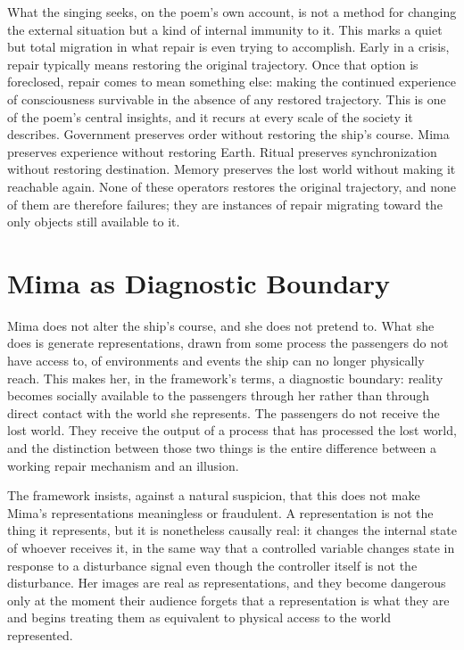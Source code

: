 \documentclass[11pt]{article}
\begin{document}
What the singing seeks, on the poem's own account, is not a method for changing the external situation but a kind of internal immunity to it. This marks a quiet but total migration in what repair is even trying to accomplish. Early in a crisis, repair typically means restoring the original trajectory. Once that option is foreclosed, repair comes to mean something else: making the continued experience of consciousness survivable in the absence of any restored trajectory. This is one of the poem's central insights, and it recurs at every scale of the society it describes. Government preserves order without restoring the ship's course. Mima preserves experience without restoring Earth. Ritual preserves synchronization without restoring destination. Memory preserves the lost world without making it reachable again. None of these operators restores the original trajectory, and none of them are therefore failures; they are instances of repair migrating toward the only objects still available to it.

\section{Mima as Diagnostic Boundary}

Mima does not alter the ship's course, and she does not pretend to. What she does is generate representations, drawn from some process the passengers do not have access to, of environments and events the ship can no longer physically reach. This makes her, in the framework's terms, a diagnostic boundary: reality becomes socially available to the passengers through her rather than through direct contact with the world she represents. The passengers do not receive the lost world. They receive the output of a process that has processed the lost world, and the distinction between those two things is the entire difference between a working repair mechanism and an illusion.

The framework insists, against a natural suspicion, that this does not make Mima's representations meaningless or fraudulent. A representation is not the thing it represents, but it is nonetheless causally real: it changes the internal state of whoever receives it, in the same way that a controlled variable changes state in response to a disturbance signal even though the controller itself is not the disturbance. Her images are real as representations, and they become dangerous only at the moment their audience forgets that a representation is what they are and begins treating them as equivalent to physical access to the world represented.
\end{document}
